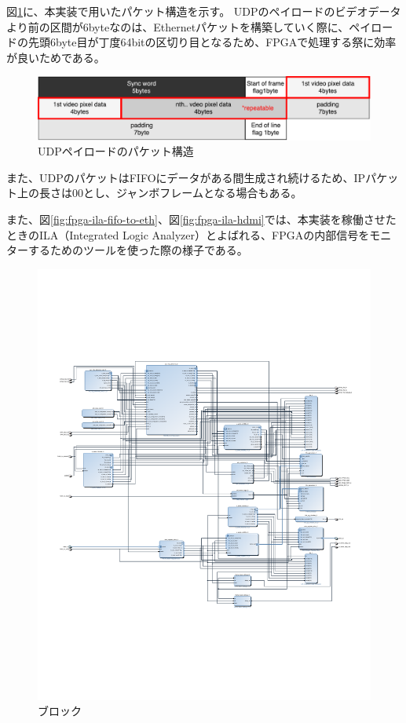 図\ref{fig:fpga-video-packet}に、本実装で用いたパケット構造を示す。
UDPのペイロードのビデオデータより前の区間が6byteなのは、Ethernetパケットを構築していく際に、ペイロードの先頭6byte目が丁度64bitの区切り目となるため、FPGAで処理する祭に効率が良いためである。

\begin{figure}[htbp]
  \begin{center}
    \includegraphics[bb=0 0 643 122,width=15.5cm]{img/fpga-video-packet.pdf}
  \end{center}
  \caption{UDPペイロードのパケット構造}
  \label{fig:fpga-video-packet}
\end{figure}

また、UDPのパケットはFIFOにデータがある間生成され続けるため、IPパケット上の長さは00とし、ジャンボフレームとなる場合もある。

また、図\ref{fig:fpga-ila-fifo-to-eth}、図\ref{fig:fpga-ila-hdmi}では、本実装を稼働させたときのILA（Integrated Logic Analyzer）とよばれる、FPGAの内部信号をモニターするためのツールを使った際の様子である。

\begin{figure}[htbp]
  \begin{center}
    \includegraphics[bb=0 0 612 792,width=15.5cm]{img/ethlogic_template_ss.pdf}
  \end{center}
  \caption{ブロック}
  \label{fig:ethlogic_template_ss}
\end{figure}

